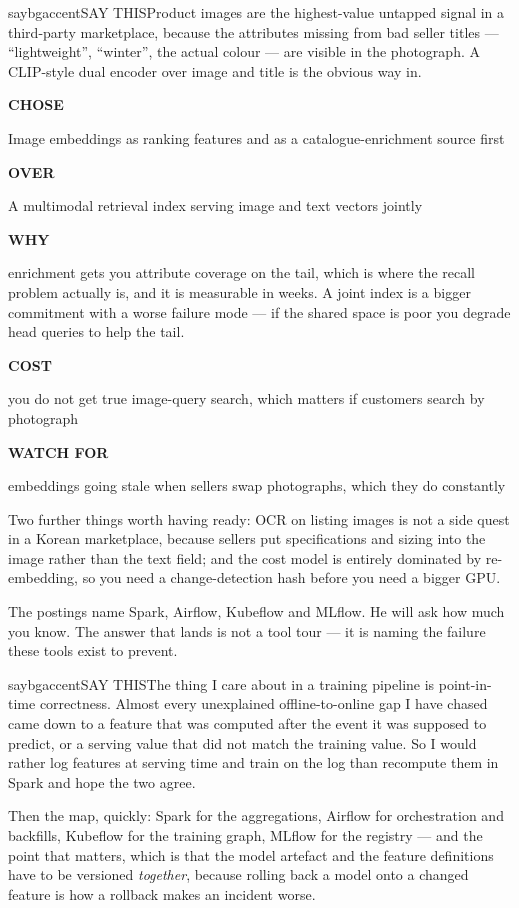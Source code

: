\documentclass[10pt,twoside]{book}
\makeatletter
\newcommand{\csection}[1]{\par\vspace{13pt}\noindent{\sffamily\large\bfseries\color{ink}\raggedright #1\par}\vspace{4pt}}
\newenvironment{calloutsay}{\begin{co@box}{saybg}{accent}{SAY THIS}}{\end{co@box}}
\newenvironment{decide}[1]{%
  \par\smallskip\noindent
  \begin{tcolorbox}[colback=white,colframe=accent,boxrule=1pt,arc=3pt,
    left=8pt,right=8pt,top=6pt,bottom=5pt,
    title={\sffamily\bfseries\small #1},coltitle=white,colbacktitle=accent,
    fonttitle=\sffamily]%
  \small%
}{\end{tcolorbox}\par\smallskip}
\newcommand{\drow}[2]{%
  \par\noindent
  \begin{minipage}[t]{58pt}\raggedright\strut
    {\sffamily\bfseries\scriptsize\color{accent}#1}\end{minipage}%
  \hspace{6pt}%
  \begin{minipage}[t]{\dimexpr\linewidth-64pt\relax}\strut #2\end{minipage}%
  \par\vspace{3.5pt}}
\makeatother
\begin{document}
\begin{calloutsay}Product images are the highest-value untapped signal in a third-party marketplace, because the attributes missing from bad seller titles --- ``lightweight'', ``winter'', the actual colour --- are visible in the photograph. A CLIP-style dual encoder over image and title is the obvious way in.\end{calloutsay}
\begin{decide}{Where does the image signal actually go?}
\drow{CHOSE}{Image embeddings as ranking features and as a catalogue-enrichment source first}
\drow{OVER}{A multimodal retrieval index serving image and text vectors jointly}
\drow{WHY}{enrichment gets you attribute coverage on the tail, which is where the recall problem actually is, and it is measurable in weeks. A joint index is a bigger commitment with a worse failure mode --- if the shared space is poor you degrade head queries to help the tail.}
\drow{COST}{you do not get true image-query search, which matters if customers search by photograph}
\drow{WATCH FOR}{embeddings going stale when sellers swap photographs, which they do constantly}
\end{decide}
Two further things worth having ready: OCR on listing images is not a side quest in a Korean marketplace, because sellers put specifications and sizing into the image rather than the text field; and the cost model is entirely dominated by re-embedding, so you need a change-detection hash before you need a bigger GPU.\par
\csection{ML infrastructure}
The postings name Spark, Airflow, Kubeflow and MLflow. He will ask how much you know. The answer that lands is not a tool tour --- it is naming the failure these tools exist to prevent.\par
\begin{calloutsay}The thing I care about in a training pipeline is point-in-time correctness. Almost every unexplained offline-to-online gap I have chased came down to a feature that was computed after the event it was supposed to predict, or a serving value that did not match the training value. So I would rather log features at serving time and train on the log than recompute them in Spark and hope the two agree.\end{calloutsay}
Then the map, quickly: Spark for the aggregations, Airflow for orchestration and backfills, Kubeflow for the training graph, MLflow for the registry --- and the point that matters, which is that the model artefact and the feature definitions have to be versioned \textit{together}, because rolling back a model onto a changed feature is how a rollback makes an incident worse.\par
\end{document}
